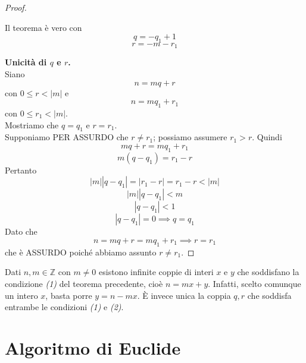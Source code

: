 \documentclass[a4paper,12pt, oneside]{book}
\begin{document}
\begin{proof}
\begin{enumerate}
\begin{itemize}
						Il teorema è vero con $$q = -q_1+1$$ $$r=-m-r_1$$
				\end{itemize}
		\end{enumerate}
		\textbf{Unicità di $q$ e $r$.}\\
		Siano $$n = mq+r$$ con $0 \leq r < |m|$ e $$n = mq_1 + r_1$$ con $0 \leq r_1 < |m|$.\\
		Mostriamo che $q=q_1$ e $r=r_1$.\\
		Supponiamo PER ASSURDO che $r \not = r_1$; possiamo assumere $r_1 > r$. Quindi
		$$mq+r=mq_1+r_1$$
		$$m(q-q_1)=r_1-r$$
		Pertanto
		$$|m||q-q_1| = |r_1-r| = r_1-r < |m|$$
		$$|m||q-q_1| < m$$
		$$|q-q_1| < 1$$
		$$|q-q_1| = 0 \implies q=q_1$$
		Dato che
		$$n = mq+r = mq_1+r_1 \implies r=r_1$$ che è ASSURDO poiché abbiamo assunto $r \not = r_1$.
	\end{proof}
	\begin{osservazione}
		Dati $n, m \in \mathbb{Z}$ con $m \not = 0$ esistono infinite coppie di interi $x$ e $y$ che soddisfano la condizione \textit{(1)} del teorema precedente, cioè $n = mx+y$. Infatti, scelto comunque un intero $x$, basta porre $y=n-mx$. È invece unica la coppia $q, r$ che soddisfa entrambe le condizioni \textit{(1)} e \textit{(2)}.
	\end{osservazione}


\chapter{Algoritmo di Euclide}
\end{document}
